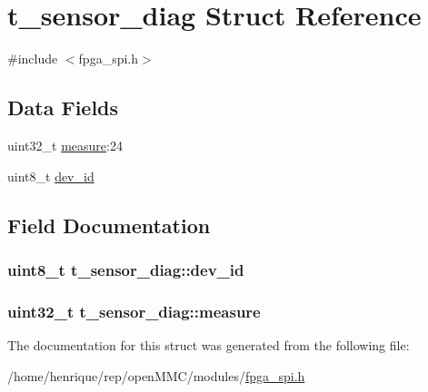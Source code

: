 \hypertarget{structt__sensor__diag}{\section{t\-\_\-sensor\-\_\-diag Struct Reference}
\label{structt__sensor__diag}
}


{\ttfamily \#include $<$fpga\-\_\-spi.\-h$>$}

\subsection*{Data Fields}
\begin{DoxyCompactItemize}
\item 
uint32\-\_\-t \hyperlink{structt__sensor__diag_a5b6c5976d07ed85814e5d30426922d95}{measure}\-:24
\item 
uint8\-\_\-t \hyperlink{structt__sensor__diag_a02a1e8f7f3f53135f7415175f474db23}{dev\-\_\-id}
\end{DoxyCompactItemize}


\subsection{Field Documentation}
\hypertarget{structt__sensor__diag_a02a1e8f7f3f53135f7415175f474db23}{
\subsubsection[{dev\-\_\-id}]{\setlength{\rightskip}{0pt plus 5cm}uint8\-\_\-t t\-\_\-sensor\-\_\-diag\-::dev\-\_\-id}}\label{structt__sensor__diag_a02a1e8f7f3f53135f7415175f474db23}
\hypertarget{structt__sensor__diag_a5b6c5976d07ed85814e5d30426922d95}{
\subsubsection[{measure}]{\setlength{\rightskip}{0pt plus 5cm}uint32\-\_\-t t\-\_\-sensor\-\_\-diag\-::measure}}\label{structt__sensor__diag_a5b6c5976d07ed85814e5d30426922d95}


The documentation for this struct was generated from the following file\-:\begin{DoxyCompactItemize}
\item 
/home/henrique/rep/open\-M\-M\-C/modules/\hyperlink{fpga__spi_8h}{fpga\-\_\-spi.\-h}\end{DoxyCompactItemize}

